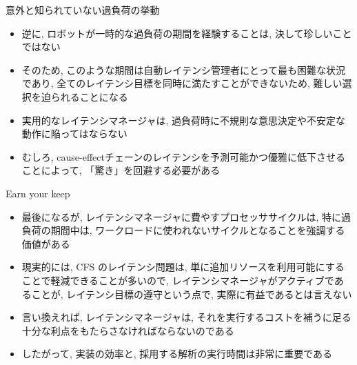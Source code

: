\begin{frame}{意外と知られていない過負荷の挙動}
    \begin{itemize}
        \item 逆に, ロボットが一時的な過負荷の期間を経験することは, 決して珍しいことではない
        \item そのため, このような期間は自動レイテンシ管理者にとって最も困難な状況であり, 全てのレイテンシ目標を同時に満たすことができないため, 難しい選択を迫られることになる
        \item 実用的なレイテンシマネージャは, 過負荷時に不規則な意思決定や不安定な動作に陥ってはならない
        \item むしろ, cause-effectチェーンのレイテンシを予測可能かつ優雅に低下させることによって, 「驚き」を回避する必要がある
    \end{itemize}
\end{frame}

\begin{frame}{Earn your keep}
    \begin{itemize}
        \item 最後になるが, レイテンシマネージャに費やすプロセッササイクルは, 特に過負荷の期間中は, ワークロードに使われないサイクルとなることを強調する価値がある
        \item 現実的には, CFS のレイテンシ問題は, 単に追加リソースを利用可能にすることで軽減できることが多いので, レイテンシマネージャがアクティブであることが, レイテンシ目標の遵守という点で, 実際に有益であるとは言えない
        \item 言い換えれば, レイテンシマネージャは, それを実行するコストを補うに足る十分な利点をもたらさなければならないのである
        \item したがって, 実装の効率と, 採用する解析の実行時間は非常に重要である
    \end{itemize}
\end{frame}
